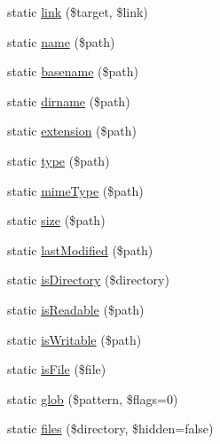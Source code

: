 \begin{DoxyCompactItemize}
\item 
static \mbox{\hyperlink{class_illuminate_1_1_support_1_1_facades_1_1_file_afe1409a45a5c4ad58f33f080a920044b}{link}} (\$target, \$link)
\item 
static \mbox{\hyperlink{class_illuminate_1_1_support_1_1_facades_1_1_file_a07e2149571901b2cb8ee8ed3804060f3}{name}} (\$path)
\item 
static \mbox{\hyperlink{class_illuminate_1_1_support_1_1_facades_1_1_file_a4292410fe2e9281cdf93724117954955}{basename}} (\$path)
\item 
static \mbox{\hyperlink{class_illuminate_1_1_support_1_1_facades_1_1_file_a59250be686860168cd5f0f5bad8c3aec}{dirname}} (\$path)
\item 
static \mbox{\hyperlink{class_illuminate_1_1_support_1_1_facades_1_1_file_a7fc0f3705cb3d6558796740a09d7c741}{extension}} (\$path)
\item 
static \mbox{\hyperlink{class_illuminate_1_1_support_1_1_facades_1_1_file_ab77fa1f772bbe857afb6f436af2aaf3f}{type}} (\$path)
\item 
static \mbox{\hyperlink{class_illuminate_1_1_support_1_1_facades_1_1_file_a23ad2113219fbb7b681bab6de6c36063}{mime\+Type}} (\$path)
\item 
static \mbox{\hyperlink{class_illuminate_1_1_support_1_1_facades_1_1_file_ae308662be3b972938b9060f5db95cee9}{size}} (\$path)
\item 
static \mbox{\hyperlink{class_illuminate_1_1_support_1_1_facades_1_1_file_a96eb9c1ffc4aabed4d270ac6eb3605d6}{last\+Modified}} (\$path)
\item 
static \mbox{\hyperlink{class_illuminate_1_1_support_1_1_facades_1_1_file_a3237a565dc6ae8c24f4b02e9ae5c3767}{is\+Directory}} (\$directory)
\item 
static \mbox{\hyperlink{class_illuminate_1_1_support_1_1_facades_1_1_file_a714920297a159ad88c60a875bdad6f8e}{is\+Readable}} (\$path)
\item 
static \mbox{\hyperlink{class_illuminate_1_1_support_1_1_facades_1_1_file_aca7ac18b51c114d25ac774b8d2b2324b}{is\+Writable}} (\$path)
\item 
static \mbox{\hyperlink{class_illuminate_1_1_support_1_1_facades_1_1_file_a7daf336670d1a9d836488e499eff44f6}{is\+File}} (\$file)
\item 
static \mbox{\hyperlink{class_illuminate_1_1_support_1_1_facades_1_1_file_af64ce811050d51d537898a17d493902f}{glob}} (\$pattern, \$flags=0)
\item 
static \mbox{\hyperlink{class_illuminate_1_1_support_1_1_facades_1_1_file_a014452088770b7b677cbe5543306f6c0}{files}} (\$directory, \$hidden=false)

\end{DoxyCompactItemize}
